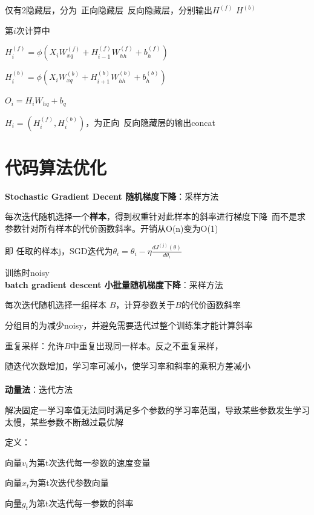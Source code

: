 \documentclass[UTF8]{ctexart}
\begin{document}
  \quad 仅有2隐藏层，分为\ 正向隐藏层\ 反向隐藏层，分别输出$H^{(f)}$ $H^{(b)}$

  \quad 第$i$次计算中

  \quad \quad $H_i^{(f)} = \phi (X_iW_{xq}^{(f)} + H_{i-1}^{(f)}W_{hh}^{(f)} + b_h^{(f)})$

  \quad \quad $H_i^{(b)} = \phi (X_iW_{xq}^{(b)} + H_{i+1}^{(b)}W_{hh}^{(b)} + b_h^{(b)})$

  \quad \quad $O_i = H_iW_{hq} + b_q$

  \quad \quad \quad $H_i = (H_i^{(f)}, H_i^{(b)})$，为正向\ 反向隐藏层的输出concat


\section{代码算法优化}
\noindent \textbf{Stochastic Gradient Decent 随机梯度下降}：采样方法

  每次迭代随机选择一个\textbf{样本}，得到权重针对此样本的斜率进行梯度下降\ 而不是求参数针对所有样本的代价函数斜率。开销从O(n)变为O(1)

  \quad 即 任取的样本j，SGD迭代为$\theta_i = \theta_i - \eta \frac{d J^{(j)}(\theta)}{d \theta_i}$
  
  \quad 训练时noisy\\
\textbf{batch gradient descent 小批量随机梯度下降}：采样方法

  每次迭代随机选择一组样本 $B$，计算参数关于$B$的代价函数斜率

  \quad 分组目的为减少noisy，并避免需要迭代过整个训练集才能计算斜率

  重复采样：允许$B$中重复出现同一样本。反之不重复采样，

  随迭代次数增加，学习率可减小，使学习率和斜率的乘积方差减小\\\\
\textbf{动量法}：迭代方法

  解决固定一学习率值无法同时满足多个参数的学习率范围，导致某些参数发生学习太慢，某些参数不断越过最优解

  定义：
  
  \quad 向量$v_t$为第t次迭代每一参数的速度变量

  \quad 向量$x_t$为第t次迭代参数向量

  \quad 向量$g_t$为第t次迭代每一参数的斜率
\end{document}
